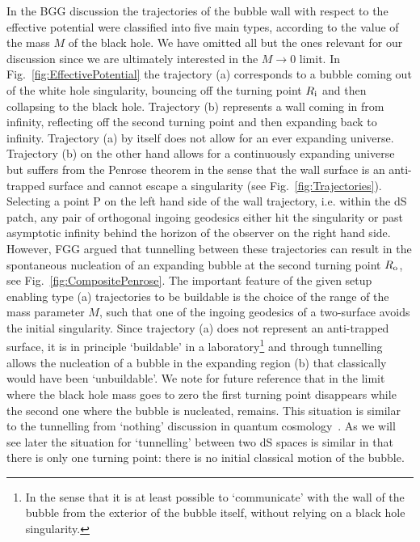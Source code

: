 \documentclass[11pt,a4paper]{article}
\begin{document}
In the BGG discussion the trajectories of the bubble wall with respect to the effective potential were classified into five main types, according to the value of the mass $M$ of the black hole. We have omitted all but the ones relevant for our discussion since we are ultimately interested in the $M\rightarrow 0$ limit. In Fig.~\ref{fig:EffectivePotential} the trajectory (a) corresponds to  a  bubble coming out of the white hole singularity, bouncing off the turning point $R_{\rm i}$ and then collapsing to the black hole. Trajectory (b) represents a wall coming in from infinity, reflecting off the second turning point and then expanding back to infinity. Trajectory (a) by itself does not allow for an ever expanding universe. Trajectory (b) on the other hand allows for a continuously expanding universe but suffers from the Penrose theorem in the sense that the wall surface is an anti-trapped surface and cannot escape a singularity (see Fig.~\ref{fig:Trajectories}). Selecting a point $\textrm{P}$ on the left hand side of the wall trajectory, i.e. within the dS patch, any pair of orthogonal ingoing geodesics either hit the singularity or past asymptotic infinity behind the horizon of the observer on the right hand side. However, FGG argued that tunnelling between these trajectories can result in the spontaneous nucleation of an expanding bubble at the second turning point $R_{\rm o}$, see Fig.~\ref{fig:CompositePenrose}. The important feature of the given setup enabling type (a) trajectories to be buildable is the  choice of the range of the mass parameter $M$, such that one of the ingoing geodesics of a two-surface avoids the initial singularity. Since trajectory (a) does not represent an anti-trapped surface, it is in principle `buildable' in a laboratory\footnote{In the sense that it is at least possible to `communicate' with the wall of the bubble from the exterior of the bubble itself, without relying on a black hole singularity.} and through tunnelling allows the nucleation of a bubble in the expanding region (b) that classically would have been `unbuildable'. We note for future reference that in the limit where the black hole mass goes to zero the first turning point disappears while the second one where the bubble is nucleated, remains. This situation is similar to the tunnelling from `nothing' discussion in quantum cosmology~\cite{Vilenkin:1982de, Hartle:1983ai, Vilenkin:1984wp}. As we will see later the situation for `tunnelling' between two dS spaces is similar in that there is only one turning point: there is no initial classical motion of the bubble.
\end{document}
